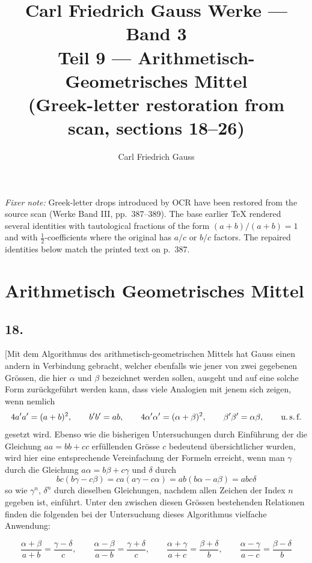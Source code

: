 \documentclass[10pt,a4paper]{article}
\title{\Huge Carl Friedrich Gauss Werke --- Band 3\\[0.5em]
\Large Teil 9 --- Arithmetisch-Geometrisches Mittel\\[0.5em]
\large (Greek-letter restoration from scan, sections 18--26)}
\author{Carl Friedrich Gauss}
\date{}
\begin{document}
\maketitle
\thispagestyle{empty}

\noindent\textit{Fixer note:} Greek-letter drops introduced by OCR
have been restored from the source scan (Werke Band III, pp.\ 387--389).
The base earlier TeX rendered several identities with tautological
fractions of the form $(a+b)/(a+b)=1$ and with $\tfrac12$-coefficients
where the original has $a/c$ or $b/c$ factors. The repaired identities
below match the printed text on p.\ 387.

\vspace{1em}

\section*{Arithmetisch Geometrisches Mittel}

\subsection*{18.}

[Mit dem Algorithmus des arithmetisch-geometrischen Mittels hat Gauss
einen andern in Verbindung gebracht, welcher ebenfalls wie jener von zwei
gegebenen Gr\"ossen, die hier $\alpha$ und $\beta$ bezeichnet werden sollen,
ausgeht und auf eine solche Form zur\"uckgef\"uhrt werden kann, dass viele
Analogien mit jenem sich zeigen, wenn nemlich
\[
4a'a'=(a+b)^2, \qquad b'b'=ab, \qquad
4\alpha'\alpha'=(\alpha+\beta)^2, \qquad \beta'\beta'=\alpha\beta, \qquad \text{u.\,s.\,f.}
\]
gesetzt wird. Ebenso wie die bisherigen Untersuchungen durch Einf\"uhrung der
die Gleichung $aa=bb+cc$ erf\"ullenden Gr\"osse $c$ bedeutend \"ubersichtlicher
wurden, wird hier eine entsprechende Vereinfachung der Formeln erreicht, wenn
man $\gamma$ durch die Gleichung $a\alpha=b\beta+c\gamma$ und $\delta$ durch
\[
bc(b\gamma-c\beta)=ca(a\gamma-c\alpha)=ab(b\alpha-a\beta)=abc\delta
\]
so wie $\gamma^n$, $\delta^n$ durch dieselben Gleichungen, nachdem allen Zeichen
der Index $n$ gegeben ist, einf\"uhrt. Unter den zwischen diesen Gr\"ossen
bestehenden Relationen finden die folgenden bei der Untersuchung dieses
Algorithmus vielfache Anwendung:

\[
\frac{\alpha+\beta}{a+b}=\frac{\gamma-\delta}{c}, \qquad
\frac{\alpha-\beta}{a-b}=\frac{\gamma+\delta}{c}, \qquad
\frac{\alpha+\gamma}{a+c}=\frac{\beta+\delta}{b}, \qquad
\frac{\alpha-\gamma}{a-c}=\frac{\beta-\delta}{b}
\]
\end{document}
